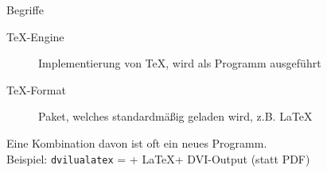 \begin{frame}{Begriffe}
  \begin{description}
    \item[\TeX-Engine] Implementierung von \TeX, wird als Programm ausgeführt
    \item[\TeX-Format] Paket, welches standardmäßig geladen wird, z.B. \LaTeX
  \end{description}

  \vspace{10pt}
  Eine Kombination davon ist oft ein neues Programm.\\[10pt]
  Beispiel: \texttt{dvilualatex} = \LuaTeX + \LaTeX + DVI-Output (statt PDF)
\end{frame}

\begin{frame}
  \centering
\end{frame}

